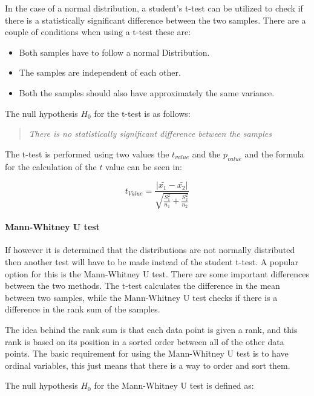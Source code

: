 In the case of a normal distribution, a student's t-test can be utilized to check if there is a statistically significant difference between the two samples. There are a couple of conditions when using a t-test these are:

\begin{itemize}
    \item Both samples have to follow a normal Distribution.
    \item The samples are independent of each other.
    \item Both the samples should also have approximately the same variance.
\end{itemize}

The null hypothesis $H_0$ for the t-test is as follows:

\begin{quote}
    \textit{There is no statistically significant difference between the samples}    
\end{quote}

The t-test is performed using two values the $t_{value}$ and the $p_{value}$ and the formula for the calculation of the $t$ value can be seen in:

\begin{equation}
    t_{Value} = \frac{|\bar{x_1}- \bar{x_2}|}{\sqrt{\frac{S_1^2}{n_1} + \frac{S_2^2}{n_2}}}  
\end{equation}

\paragraph{Mann-Whitney U test}
If however it is determined that the distributions are not normally distributed then another test will have to be made instead of the student t-test. A popular option for this is the Mann-Whitney U test. There are some important differences between the two methods. The t-test calculates the difference in the mean between two samples, while the Mann-Whitney U test checks if there is a difference in the rank sum of the samples.\cite{mann1947test} 

The idea behind the rank sum is that each data point is given a rank, and this rank is based on its position in a sorted order between all of the other data points. 
The basic requirement for using the Mann-Whitney U test is to have ordinal variables, this just means that there is a way to order and sort them.

The null hypothesis $H_0$ for the Mann-Whitney U test is defined as:

